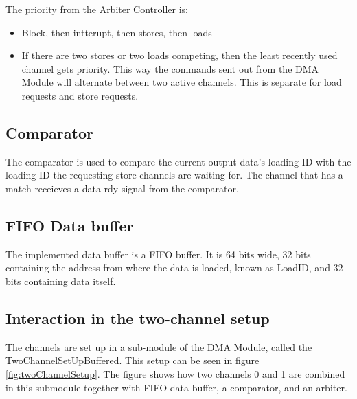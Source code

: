 \begin{appendix}
The priority from the Arbiter Controller is:
\begin{itemize}
    \item Block, then intterupt, then stores, then loads
    \item If there are two stores or two loads competing, then the least recently used channel gets priority.
    This way the commands sent out from the DMA Module will alternate between two active channels. 
    This is separate for load requests and store requests.
\end{itemize}

\subsection{Comparator}
The comparator is used to compare the current output data's loading ID with the loading ID the requesting store channels are waiting for.
The channel that has a match receieves a data rdy signal from the comparator. 

\subsection{FIFO Data buffer}
The implemented data buffer is a FIFO buffer.
It is 64 bits wide, 32 bits containing the address from where the data is loaded, known as LoadID, and 32 bits containing data itself.

\subsection{Interaction in the two-channel setup}
The channels are set up in a sub-module of the DMA Module, called the TwoChannelSetUpBuffered.
This setup can be seen in figure \ref{fig:twoChannelSetup}.
The figure shows how two channels 0 and 1 are combined in this submodule together with FIFO data buffer, a comparator, and an arbiter.


\end{appendix}
